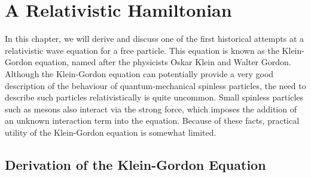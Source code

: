 \documentclass[titlepage,letterpaper,onecolumn,11pt,final]{report}
\numberwithin{equation}{section}
\numberwithin{figure}{section}
\begin{document}
\chapter{A Relativistic Hamiltonian}

In this chapter, we will derive and discuss one of the first historical attempts at a relativistic wave equation for a free particle. This equation is known as the Klein-Gordon equation, named after the physicists Oskar Klein and Walter Gordon. Although the Klein-Gordon equation can potentially provide a very good description of the behaviour of quantum-mechanical spinless particles, the need to describe such particles relativistically is quite uncommon. Small spinless particles such as mesons also interact via the strong force, which imposes the addition of an unknown interaction term into the equation. Because of these facts, practical utility of the Klein-Gordon equation is somewhat limited.

\section{Derivation of the Klein-Gordon Equation}
\end{document}
